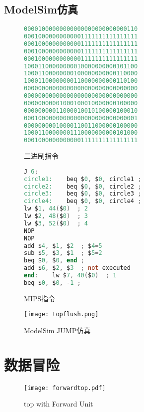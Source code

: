 \documentclass[a4paper]{article}
\begin{document}
    \subsection{ModelSim仿真}
        \begin{figure}[h]
        \begin{minipage}[t]{0.54\linewidth}
        \centering
            \begin{lstlisting}[language={Verilog}]
00001000000000000000000000000110
00010000000000001111111111111111
00010000000000001111111111111111
00010000000000001111111111111111
00010000000000001111111111111111
10001100000000010000000000101100
10001100000000100000000000110000
10001100000000110000000000110100
00000000000000000000000000000000
00000000000000000000000000000000
00000000001000100010000000100000
00000000011000010010100000100010
00010000000000000000000000000001
00000000010000110011000000100000
10001100000001110000000000101000
00010000000000001111111111111111  \end{lstlisting}
        \caption{二进制指令}
        \end{minipage}%
        \begin{minipage}[t]{0.46\linewidth}
        \centering
            \begin{lstlisting}[language={Verilog}]
J 6;
circle1:    beq $0, $0, circle1 ;
circle2:    beq $0, $0, circle2 ;
circle3:    beq $0, $0, circle3 ;
circle4:    beq $0, $0, circle4 ;
lw $1, 44($0)  ; 2
lw $2, 48($0)  ; 3
lw $3, 52($0)  ; 4
NOP
NOP
add $4, $1, $2  ; $4=5
sub $5, $3, $1  ; $5=2
beq $0, $0, end ;
add $6, $2, $3  ; not executed
end:    lw $7, 40($0)  ; 1
beq $0, $0, -1 ;   \end{lstlisting}
        \caption{MIPS指令}
        \end{minipage}
    \end{figure}
           \begin{figure}
            \centering
                \texttt{[image: topflush.png]}
            \caption{ModelSim JUMP仿真}
        \end{figure}


    \section{数据冒险}
\begin{figure}[h]
  \centering
  \texttt{[image: forwardtop.pdf]}
  \caption{top with Forward Unit}
  \end{figure}
\end{document}
